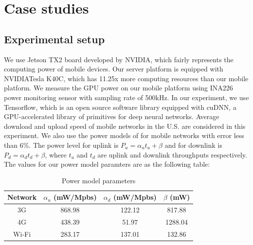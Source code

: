 \documentclass[conference,9pt]{IEEEtran}
\begin{document}

\section{Case studies}\label{case_studies}
\subsection{Experimental setup}
We use Jetson TX2 board developed by NVIDIA\cite{b18}, which fairly represents the computing power of mobile devices. Our server platform is equipped with NVIDIA\textregistered  Tesla \texttrademark  K40C\cite{b17}, which has 11.25x more computing resources than our mobile platform. We measure the GPU power on our mobile platform using INA226 power monitoring sensor with sampling rate of 500kHz\cite{b21}. In our experiment, we use Tensorflow\texttrademark\cite{b11}, which is an open source software library equipped with cuDNN\cite{b12}, a GPU-accelerated library of primitives for deep neural networks.
Average download and upload speed of mobile networks in the U.S. are considered in this experiment\cite{b13}\cite{b14}. We also use the power models of \cite{b16} for mobile networks with error less than 6\%. The power level for uplink is $P_u = \alpha_u t_u + \beta$ and for downlink is $P_d = \alpha_d t_d + \beta$, where $t_u$ and $t_d$ are uplink and downlink throughputs respectively. The values for our power model paramters are as the following table:
\begin{table}[ht]
\caption{Power model parameters} %
\centering %
\begin{tabular}{|c|c|c|c|} %
\hline %
\textbf{Network}& \textbf{$\alpha_u$ (mW/Mpbs)}&\textbf{$\alpha_d$ (mW/Mpbs)}& \textbf{$\beta$ (mW)}\\ [0.5ex] %
\hline %
3G & 868.98 & 122.12 & 817.88\\
\hline
4G & 438.39 & 51.97 & 1288.04\\
\hline
Wi-Fi & 283.17 & 137.01 & 132.86\\
\hline %
\end{tabular}
\label{table:power_model_parameters} %
\end{table}
\end{document}
